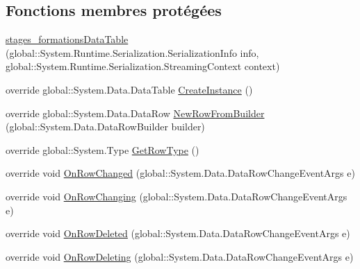 \subsection*{Fonctions membres protégées}
\begin{DoxyCompactItemize}
\item 
\hyperlink{classforma_1_1formadb_data_set_1_1stages__formations_data_table_af53bcdf1363bebec922962ef1996524c}{stages\+\_\+formations\+Data\+Table} (global\+::\+System.\+Runtime.\+Serialization.\+Serialization\+Info info, global\+::\+System.\+Runtime.\+Serialization.\+Streaming\+Context context)
\item 
override global\+::\+System.\+Data.\+Data\+Table \hyperlink{classforma_1_1formadb_data_set_1_1stages__formations_data_table_afc44c5b37b5cd2a51df67b492de2bc59}{Create\+Instance} ()
\item 
override global\+::\+System.\+Data.\+Data\+Row \hyperlink{classforma_1_1formadb_data_set_1_1stages__formations_data_table_af7b2f478c13f400124220b6ead51b4f3}{New\+Row\+From\+Builder} (global\+::\+System.\+Data.\+Data\+Row\+Builder builder)
\item 
override global\+::\+System.\+Type \hyperlink{classforma_1_1formadb_data_set_1_1stages__formations_data_table_a0d19d5e32ed0347ddfdf75f6aa1beb25}{Get\+Row\+Type} ()
\item 
override void \hyperlink{classforma_1_1formadb_data_set_1_1stages__formations_data_table_a3d07984a694b06b0fc630eae720c6dd6}{On\+Row\+Changed} (global\+::\+System.\+Data.\+Data\+Row\+Change\+Event\+Args e)
\item 
override void \hyperlink{classforma_1_1formadb_data_set_1_1stages__formations_data_table_ab2488e3ec404b448e0396dd51d48982b}{On\+Row\+Changing} (global\+::\+System.\+Data.\+Data\+Row\+Change\+Event\+Args e)
\item 
override void \hyperlink{classforma_1_1formadb_data_set_1_1stages__formations_data_table_abe42b0c8171cb0728c933955da565337}{On\+Row\+Deleted} (global\+::\+System.\+Data.\+Data\+Row\+Change\+Event\+Args e)
\item 
override void \hyperlink{classforma_1_1formadb_data_set_1_1stages__formations_data_table_af4c566b6cd5ffd703c89e29dc0baa686}{On\+Row\+Deleting} (global\+::\+System.\+Data.\+Data\+Row\+Change\+Event\+Args e)
\end{DoxyCompactItemize}
